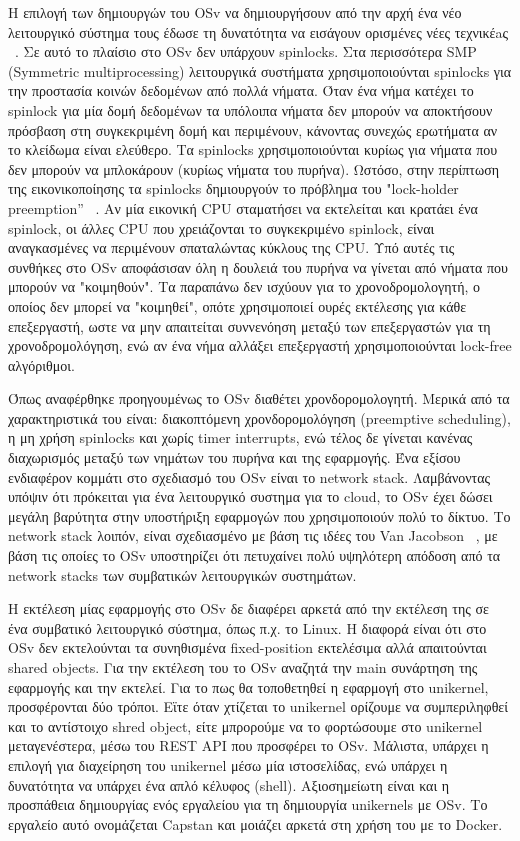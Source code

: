 Η επιλογή των δημιουργών του OSv να δημιουργήσουν από την αρχή ένα νέο
λειτουργικό σύστημα τους έδωσε τη δυνατότητα να εισάγουν ορισμένες νέες
τεχνικέaς ~\cite{kivity2014v}. Σε αυτό το πλαίσιο στο OSv δεν υπάρχουν
spinlocks. Στα περισσότερα SMP (Symmetric multiprocessing)
λειτουργικά συστήματα χρησιμοποιούνται spinlocks για την προστασία κοινών
δεδομένων από πολλά νήματα. Όταν ένα νήμα κατέχει το spinlock για μία δομή
δεδομένων τα υπόλοιπα νήματα δεν μπορούν να αποκτήσουν πρόσβαση στη συγκεκριμένη
δομή και περιμένουν, κάνοντας συνεχώς ερωτήματα αν το κλείδωμα είναι ελεύθερο.
Τα spinlocks χρησιμοποιούνται κυρίως για νήματα που δεν μπορούν να μπλοκάρουν
(κυρίως νήματα του πυρήνα). Ωστόσο, στην περίπτωση της εικονικοποίησης τα
spinlocks δημιουργούν το πρόβλημα του "lock-holder preemption”
~\cite{uhlig2004towards}. Αν μία εικονική CPU σταματήσει να εκτελείται και
κρατάει ένα spinlock, οι άλλες CPU που χρειάζονται το συγκεκριμένο spinlock,
είναι αναγκασμένες να περιμένουν σπαταλώντας κύκλους της CPU. Υπό αυτές τις
συνθήκες στο OSv αποφάσισαν όλη η δουλειά του πυρήνα να γίνεται από νήματα που
μπορούν να "κοιμηθούν". Τα παραπάνω δεν ισχύουν για το χρονοδρομολογητή, ο
οποίος δεν μπορεί να "κοιμηθεί", οπότε χρησιμοποιεί ουρές εκτέλεσης για κάθε
επεξεργαστή, ωστε να μην απαιτείται συννενόηση μεταξύ των επεξεργαστών για τη
χρονοδρομολόγηση, ενώ αν ένα νήμα αλλάξει επεξεργαστή χρησιμοποιούνται lock-free
αλγόριθμοι.

Όπως αναφέρθηκε προηγουμένως το OSv διαθέτει χρονδορομολογητή. Μερικά από τα
χαρακτηριστικά του είναι: διακοπτόμενη χρονδορομολόγηση (preemptive scheduling),
η μη χρήση spinlocks και χωρίς timer interrupts, ενώ τέλος δε γίνεται κανένας
διαχωρισμός μεταξύ των νημάτων του πυρήνα και της εφαρμογής. Ένα εξίσου
ενδιαφέρον κομμάτι στο σχεδιασμό του OSv είναι το network stack. Λαμβάνοντας
υπόψιν ότι πρόκειται για ένα λειτουργικό συστημα για το cloud, το OSv έχει δώσει
μεγάλη βαρύτητα στην υποστήριξη εφαρμογών που χρησιμοποιούν πολύ το δίκτυο. Το
network stack λοιπόν, είναι σχεδιασμένο με βάση τις ιδέες του Van Jacobson
~\cite{jacobson2006speeding}, με βάση τις οποίες το OSv υποστηρίζει ότι
πετυχαίνει πολύ υψηλότερη απόδοση από τα network stacks των συμβατικών
λειτουργικών συστημάτων. 

H εκτέλεση μίας εφαρμογής στο OSv δε διαφέρει αρκετά από την εκτέλεση της σε ένα
συμβατικό λειτουργικό σύστημα, όπως π.χ. το Linux. Η διαφορά είναι ότι στο OSv
δεν εκτελούνται τα συνηθισμένα fixed-position εκτελέσιμα αλλά απαιτούνται shared
objects. Για την εκτέλεση του το OSv αναζητά την main συνάρτηση της εφαρμογής
και την εκτελεί. Για το πως θα τοποθετηθεί η εφαρμογή στο unikernel,
προσφέρονται δύο τρόποι. Εϊτε όταν χτίζεται το unikernel ορίζουμε να
συμπεριληφθεί και το αντίστοιχο shred object, είτε μπρορούμε να το φορτώσουμε
στο unikernel μεταγενέστερα, μέσω του REST API που προσφέρει το OSv. Μάλιστα,
υπάρχει η επιλογή για διαχείρηση του unikernel μέσω μία ιστοσελίδας, ενώ υπάρχει
η δυνατότητα να υπάρχει ένα απλό κέλυφος (shell). Αξιοσημείωτη είναι και η
προσπάθεια δημιουργίας ενός εργαλείου για τη δημιουργία unikernels με OSv. Το
εργαλείο αυτό ονομάζεται Capstan και μοιάζει αρκετά στη χρήση του με το Docker.

